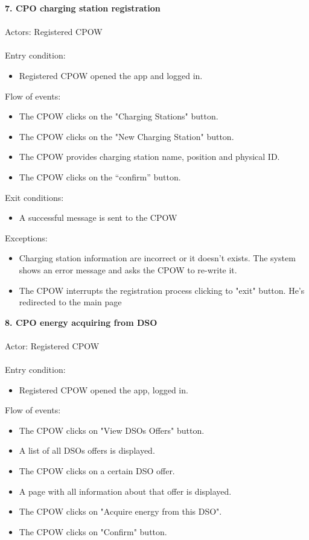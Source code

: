 \documentclass[a4paper]{report}
\begin{document}
\textbf{7. CPO charging station registration}\label{uc:1}
\\
\\
Actors: Registered CPOW\\ \\
Entry condition: 
\begin{itemize}
\item Registered CPOW opened the app and logged in.
\end{itemize}
Flow of events:
\begin{itemize}
\item The CPOW clicks on the "Charging Stations" button.
\item The CPOW clicks on the "New Charging Station" button.
\item The CPOW provides charging station name, position and physical ID.
\item The CPOW clicks on the “confirm” button.
\end{itemize}
Exit conditions: 
\begin{itemize}
\item A successful message is sent to the CPOW
\end{itemize}
Exceptions: 
\begin{itemize}
\item Charging station information are incorrect or it doesn't exists. The system shows an error message and asks the CPOW to re-write it.
\item The CPOW interrupts the registration process clicking to "exit" button. He's redirected to the main page
\end{itemize}
\textbf{8. CPO energy acquiring from DSO}\label{uc:8}
\\ \\
Actor: Registered CPOW \\ \\
Entry condition: 
\begin{itemize}
\item Registered CPOW opened the app, logged in.
\end{itemize}
Flow of events:
\begin{itemize}
\item The CPOW clicks on "View DSOs Offers" button.
\item A list of all DSOs offers is displayed.
\item The CPOW clicks on a certain DSO offer.
\item A page with all information about that offer is displayed.
\item The CPOW clicks on "Acquire energy from this DSO".
\item The CPOW clicks on "Confirm" button.
\end{itemize}
\end{document}
